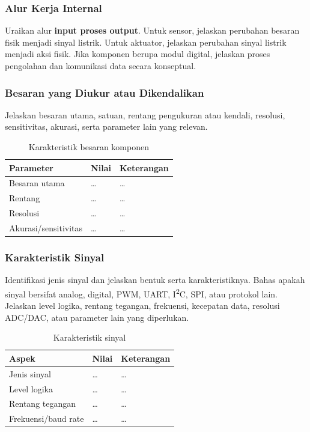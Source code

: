 \subsubsection{Alur Kerja Internal}
Uraikan alur \textbf{input \textrightarrow proses \textrightarrow output}.
Untuk sensor, jelaskan perubahan besaran fisik menjadi sinyal listrik.
Untuk aktuator, jelaskan perubahan sinyal listrik menjadi aksi fisik.
Jika komponen berupa modul digital, jelaskan proses pengolahan dan komunikasi
data secara konseptual.

\subsubsection{Besaran yang Diukur atau Dikendalikan}
Jelaskan besaran utama, satuan, rentang pengukuran atau kendali, resolusi,
sensitivitas, akurasi, serta parameter lain yang relevan.

\begin{table}[H]
\centering
\caption{Karakteristik besaran komponen}
\begin{tabularx}{\textwidth}{@{}lXX@{}}
\toprule
Parameter & Nilai & Keterangan \\
\midrule
Besaran utama & \dots & \dots \\
Rentang & \dots & \dots \\
Resolusi & \dots & \dots \\
Akurasi/sensitivitas & \dots & \dots \\
\bottomrule
\end{tabularx}
\end{table}

\subsubsection{Karakteristik Sinyal}
Identifikasi jenis sinyal dan jelaskan bentuk serta karakteristiknya. Bahas
apakah sinyal bersifat analog, digital, PWM, UART, I\textsuperscript{2}C,
SPI, atau protokol lain. Jelaskan level logika, rentang tegangan, frekuensi,
kecepatan data, resolusi ADC/DAC, atau parameter lain yang diperlukan.

\begin{table}[H]
\centering
\caption{Karakteristik sinyal}
\begin{tabularx}{\textwidth}{@{}lXX@{}}
\toprule
Aspek & Nilai & Keterangan \\
\midrule
Jenis sinyal & \dots & \dots \\
Level logika & \dots & \dots \\
Rentang tegangan & \dots & \dots \\
Frekuensi/baud rate & \dots & \dots \\
\bottomrule
\end{tabularx}
\end{table}

